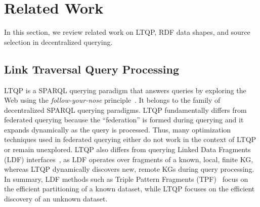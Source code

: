 \section{Related Work}\label{sec:related_work}

In this section, we review related work on LTQP, RDF data shapes, and source selection in decentralized querying.

\subsection{Link Traversal Query Processing}
LTQP is a SPARQL querying paradigm that answers queries by exploring the Web using the \textit{follow-your-nose} principle~\cite{hartig2016walking}.
It belongs to the family of decentralized SPARQL querying paradigms.
LTQP fundamentally differs from federated querying because the ``federation'' is formed during querying and it expands dynamically as the query is processed.
Thus, many optimization techniques used in federated querying either do not work in the context of LTQP or remain unexplored.
LTQP also differs from querying Linked Data Fragments (LDF) interfaces~\cite{azzam2020smart,azzam2021wisekg,DBLP:journals/corr/HartigA16}, as LDF operates over fragments of a known, local, finite KG, whereas LTQP dynamically discovers new, remote KGs during query processing. 
In summary, LDF methods such as Triple Pattern Fragments (TPF)~\cite{verborgh2016triple} focus on the efficient partitioning of a known dataset, while LTQP focuses on the efficient discovery of an unknown dataset.


